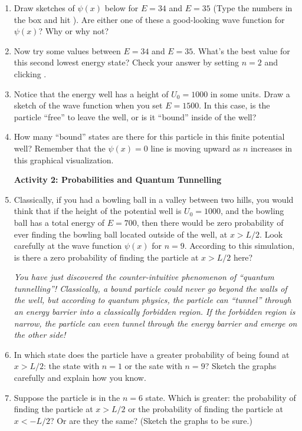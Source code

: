 \begin{enumerate}[wide]
\item Draw sketches of $\psi(x)$ below for $E = 34$ and $E = 35$ (Type the numbers in the  box and hit ). Are either one of these a good-looking wave function for $\psi(x)$? Why or why not?
\answerspace{1.5in}

\item Now try some values between $E = 34$ and $E = 35$. What's the best value for this second lowest energy state? Check your answer by setting $n = 2$ and clicking .
\answerspace{0.5in}

\item Notice that the energy well has a height of $U_0 = 1000$ in some units. Draw a sketch of the wave function when you set $E = 1500$. In this case, is the particle ``free'' to leave the well, or is it ``bound'' inside of the well?
\answerspace{0.5in}

\item How many ``bound'' states are there for this particle in this finite potential well?  Remember that the $\psi(x)=0$ line is moving upward as $n$ increases in this graphical visualization.
\answerspace{0.5in}

\textbf{Activity 2: Probabilities and Quantum Tunnelling}

\item Classically, if you had a bowling ball in a valley between two hills, you would think that if the height of the potential well is $U_0 = 1000$, and the bowling ball has a total energy of $E = 700$, then there would be zero probability of ever finding the bowling ball located outside of the well, at $x > L/2$.  Look carefully at the wave function $\psi(x)$ for $n = 9$. According to this simulation, is there a zero probability of finding the particle at $ x > L/2$ here?
\answerspace{0.8in}

\pagebreak[2]

\textit{You have just discovered the counter-intuitive phenomenon of ``quantum tunnelling''!  Classically, a bound particle could never go beyond the walls of the well, but according to quantum physics, the particle can ``tunnel'' through an energy barrier into a classically forbidden region.  If the forbidden region is narrow, the particle can even tunnel through the energy barrier and emerge on the other side!}

\item In which state does the particle have a greater probability of being found at $x > L/2$: the state with $n=1$ or the sate with $n=9$?  Sketch the graphs carefully and explain how you know.
\answerspace{1.5in}

\item Suppose the particle is in the $n = 6$ state. Which is greater: the probability of finding the particle at $x > L/2$ or the probability of finding the particle at $x < -L/2$?  Or are they the same? (Sketch the graphs to be sure.)
\answerspace{1.5in}

\end{enumerate}

